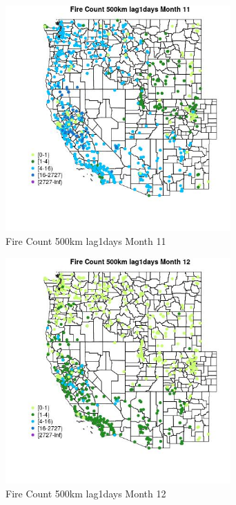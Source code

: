\begin{figure} 
\centering  
\includegraphics[width=0.77\textwidth]{Code_Outputs/Report_ML_input_PM25_Step4_part_f_de_duplicated_aves_prioritize_24hr_obswNAs_MapObsMo11Fire_Count_500km_lag1days.jpg} 
\caption{\label{fig:Report_ML_input_PM25_Step4_part_f_de_duplicated_aves_prioritize_24hr_obswNAsMapObsMo11Fire_Count_500km_lag1days}Fire Count 500km lag1days Month 11} 
\end{figure} 
 

\begin{figure} 
\centering  
\includegraphics[width=0.77\textwidth]{Code_Outputs/Report_ML_input_PM25_Step4_part_f_de_duplicated_aves_prioritize_24hr_obswNAs_MapObsMo12Fire_Count_500km_lag1days.jpg} 
\caption{\label{fig:Report_ML_input_PM25_Step4_part_f_de_duplicated_aves_prioritize_24hr_obswNAsMapObsMo12Fire_Count_500km_lag1days}Fire Count 500km lag1days Month 12} 
\end{figure} 
 


